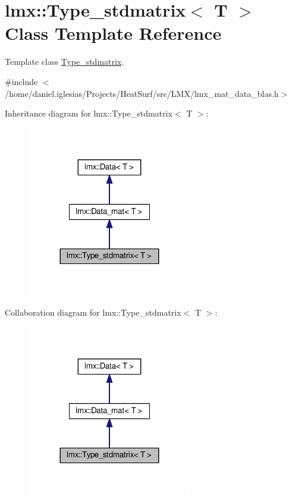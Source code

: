 \hypertarget{classlmx_1_1Type__stdmatrix}{\section{lmx\-:\-:Type\-\_\-stdmatrix$<$ T $>$ Class Template Reference}
\label{classlmx_1_1Type__stdmatrix}
}


Template class \hyperlink{classlmx_1_1Type__stdmatrix}{Type\-\_\-stdmatrix}.  




{\ttfamily \#include $<$/home/daniel.\-iglesias/\-Projects/\-Heat\-Surf/src/\-L\-M\-X/lmx\-\_\-mat\-\_\-data\-\_\-blas.\-h$>$}



Inheritance diagram for lmx\-:\-:Type\-\_\-stdmatrix$<$ T $>$\-:
\nopagebreak
\begin{figure}[H]
\begin{center}
\leavevmode
\includegraphics[width=204pt]{classlmx_1_1Type__stdmatrix__inherit__graph}
\end{center}
\end{figure}


Collaboration diagram for lmx\-:\-:Type\-\_\-stdmatrix$<$ T $>$\-:
\nopagebreak
\begin{figure}[H]
\begin{center}
\leavevmode
\includegraphics[width=204pt]{classlmx_1_1Type__stdmatrix__coll__graph}
\end{center}
\end{figure}
